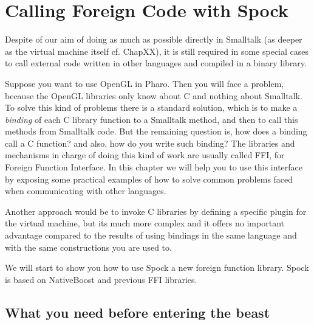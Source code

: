 \documentclass[a4paper,10pt,twoside]{book}
\begin{document}
	\sloppy
\fi


\newcommand{\Spock}[0]{Spock } %
\chapter{Calling Foreign Code with Spock}\label{cha:alien}

Despite of our aim of doing as much as possible directly in Smalltalk (as deeper as the virtual machine itself cf. ChapXX), it is still required in some special cases to call external code written in other languages and compiled in a binary library.

Suppose you want to use OpenGL in Pharo. Then you will face a problem, because the OpenGL libraries
only know about C and nothing about Smalltalk. To solve this kind of problems there is a
standard solution, which is to make a \emph{binding} of each C library function to a Smalltalk method, 
and then to call this methods from Smalltalk code. But the remaining question is, how does a binding call a 
C function? and also, how do you write such binding? The libraries and mechanisms in charge of doing this kind of work are usually called FFI, for Foreign Function Interface. In this chapter we will help you to use this interface by exposing some practical examples of
how to solve common problems faced when communicating with other languages.


Another approach would be to invoke C libraries by defining a specific plugin for the virtual machine, but its much more complex and it offers no important advantage compared to the results of using bindings in the same language and with the same constructions you are used to.

We will start to show you how to use \Spock a new foreign function library. \Spock is based on NativeBoost and previous FFI libraries.


\section{What you need before entering the beast}
\end{document}
